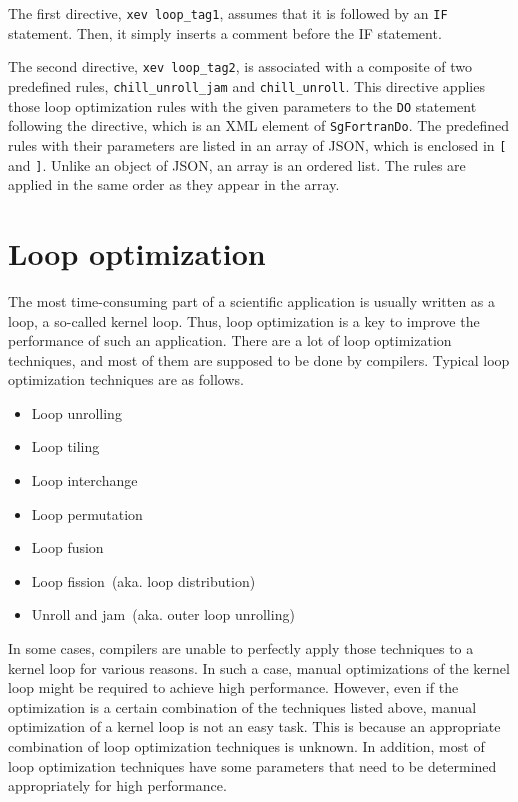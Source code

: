 The first directive, \texttt{xev loop\_tag1}, assumes that it is
followed by an \texttt{IF} statement. Then, it simply inserts a comment
before the IF statement.

The second directive, \texttt{xev loop\_tag2}, is associated with a
composite of two predefined rules, \texttt{chill\_unroll\_jam} and
\texttt{chill\_unroll}.  This directive applies those loop optimization
rules with the given parameters to the \texttt{DO} statement following
the directive, which is an XML element of \texttt{SgFortranDo}.  The
predefined rules with their parameters are listed in an array of JSON,
which is enclosed in \texttt{[} and \texttt{]}. Unlike an object of
JSON, an array is an ordered list. The rules are applied in the same
order as they appear in the array.

\section{Loop optimization}
The most time-consuming part of a scientific application is usually
written as a loop, a so-called kernel loop.  Thus, loop optimization is
a key to improve the performance of such an application.  There are a
lot of loop optimization techniques, and most of them are supposed to be
done by compilers. Typical loop optimization techniques are as follows.
\begin{itemize}
 \item Loop unrolling
 \item Loop tiling
 \item Loop interchange
 \item Loop permutation
 \item Loop fusion
 \item Loop fission~(aka. loop distribution)
 \item Unroll and jam~(aka. outer loop unrolling)
\end{itemize}

In some cases, compilers are unable to perfectly apply those techniques
to a kernel loop for various reasons.  In such a case, manual
optimizations of the kernel loop might be required to achieve high
performance. However, even if the optimization is a certain combination
of the techniques listed above, manual optimization of a kernel loop is
not an easy task. This is because an appropriate combination of loop
optimization techniques is unknown. In addition, most of loop
optimization techniques have some parameters that need to be determined
appropriately for high performance.

